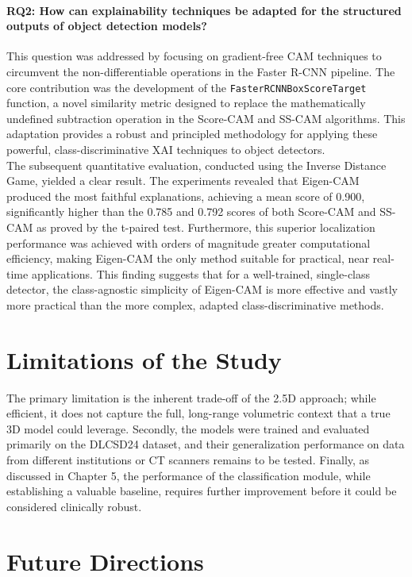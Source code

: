 \paragraph{RQ2: How can explainability techniques be adapted for the structured outputs of object detection models?}
This question was addressed by focusing on gradient-free CAM techniques to circumvent the non-differentiable operations in the Faster R-CNN pipeline. The core contribution was the development of the \texttt{FasterRCNNBoxScoreTarget} function, a novel similarity metric designed to replace the mathematically undefined subtraction operation in the Score-CAM and SS-CAM algorithms. This adaptation provides a robust and principled methodology for applying these powerful, class-discriminative XAI techniques to object detectors.\\


The subsequent quantitative evaluation, conducted using the Inverse Distance Game, yielded a clear result. The experiments revealed that Eigen-CAM produced the most faithful explanations, achieving a mean score of 0.900, significantly higher than the 0.785 and 0.792 scores of both Score-CAM and SS-CAM as proved by the t-paired test. Furthermore, this superior localization performance was achieved with orders of magnitude greater computational efficiency, making Eigen-CAM the only method suitable for practical, near real-time applications. This finding suggests that for a well-trained, single-class detector, the class-agnostic simplicity of Eigen-CAM is more effective and vastly more practical than the more complex, adapted class-discriminative methods.

\section{Limitations of the Study}
\label{sec:limitations}

The primary limitation is the inherent trade-off of the 2.5D approach; while efficient, it does not capture the full, long-range volumetric context that a true 3D model could leverage. Secondly, the models were trained and evaluated primarily on the DLCSD24 dataset, and their generalization performance on data from different institutions or CT scanners remains to be tested. Finally, as discussed in Chapter 5, the performance of the classification module, while establishing a valuable baseline, requires further improvement before it could be considered clinically robust.

\section{Future Directions}
\label{sec:future_directions}

